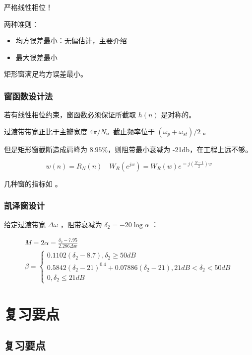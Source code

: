 \documentclass[cn,11pt,chinese,black,simple]{elegantbook}
\begin{document}
严格线性相位！

两种准则：

\begin{itemize}
    \item 均方误差最小：无偏估计，主要介绍
    \item 最大误差最小
\end{itemize}

矩形窗满足均方误差最小。

\subsection{窗函数设计法}

若有线性相位约束，窗函数必须保证所截取 \(h(n)\) 是对称的。

过渡带带宽正比于主瓣宽度 \(4 \pi / N\)。截止频率位于 \((\omega_p + \omega_{st}) / 2\) 。

但是矩形窗截断造成肩峰为 \(8.95 \%\)，则阻带最小衰减为 -21db，在工程上远不够。

\[
w(n)=R_{N}(n) \quad W_{R}\left(e^{j w}\right)=W_{R}(w) e^{=j\left(\frac{N-1}{2}\right) w}
\]

几种窗的指标如 。


\subsection{凯泽窗设计}

给定过渡带宽 \(\Delta \omega\) ，阻带衰减为 \(\delta_2 = -20 \log \alpha\) ：

\[
\begin{array}{l}
M=2 \alpha=\frac{\delta_{2}-7.95}{2.286 \Delta w} \\
\beta=\left\{\begin{array}{l}
0.1102\left(\delta_{2}-8.7\right), \delta_{2} \geq 50 d B \\
0.5842\left(\delta_{2}-21\right)^{0.4}+0.07886\left(\delta_{2}-21\right), 21 d B<\delta_{2}<50 d B \\
0, \delta_{2} \leq 21 d B
\end{array}\right.
\end{array}
\]

\chapter{复习要点}

\section{复习要点}
\end{document}
